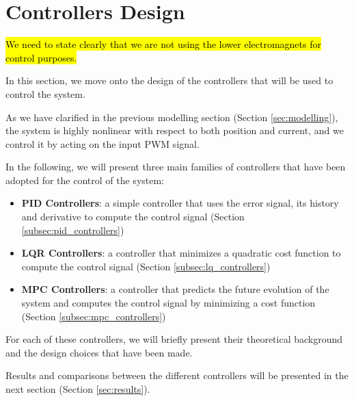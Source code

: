 \section{Controllers Design}
\label{sec:controllers_design}

\hl{We need to state clearly that we are not using the lower electromagnets for control purposes.}

In this section, we move onto the design of the controllers that will be used to control the system.

As we have clarified in the previous modelling section (Section \ref{sec:modelling}), the system is highly nonlinear with respect to both position and current, and we control it by acting on the input PWM signal.

In the following, we will present three main families of controllers that have been adopted for the control of the system:

\begin{itemize}
    \item \textbf{PID Controllers}: a simple controller that uses the error signal, its history and derivative to compute the control signal (Section \ref{subsec:pid_controllers})
    \item \textbf{LQR Controllers}: a controller that minimizes a quadratic cost function to compute the control signal (Section \ref{subsec:lq_controllers})
    \item \textbf{MPC Controllers}: a controller that predicts the future evolution of the system and computes the control signal by minimizing a cost function (Section \ref{subsec:mpc_controllers})
\end{itemize}

For each of these controllers, we will briefly present their theoretical background and the design choices that have been made.

Results and comparisons between the different controllers will be presented in the next section (Section \ref{sec:results}).



